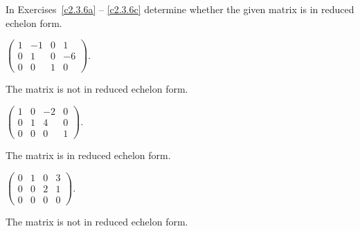 \documentclass{ximera}
\begin{document}
\noindent In Exercises~\ref{c2.3.6a} -- \ref{c2.3.6c} determine
whether the given matrix is in reduced echelon form.
\begin{exercise} \label{c2.3.6a}
$\left(\begin{array}{rrrr}
1 & -1 &  0 &   1   \\
0 &  1 &  0 &  -6    \\
         0 &  0 &  1 &   0   \end{array}\right)$.
     \begin{multipleChoice}
     \end{multipleChoice}

\begin{solution}
The matrix is not in reduced echelon form.


\end{solution}
\end{exercise}
\begin{exercise} \label{c2.3.6b}
$\left(\begin{array}{rrrr}
1 &  0 & -2 &   0   \\
0 &  1 &  4 &   0    \\
         0 &  0 &  0 &   1  \end{array}\right)$.
     \begin{multipleChoice}
     \end{multipleChoice}     

\begin{solution}
The matrix is in reduced echelon form.

\end{solution}
\end{exercise}
\begin{exercise} \label{c2.3.6c}
$\left(\begin{array}{rrrr}
0 &  1 &  0 &   3   \\
0 &  0 &  2 &   1    \\
         0 &  0 &  0 &   0   \end{array}\right)$.
     \begin{multipleChoice}
     \end{multipleChoice}     

\begin{solution}
The matrix is not in reduced echelon form.

\end{solution}
\end{exercise}
\end{document}
